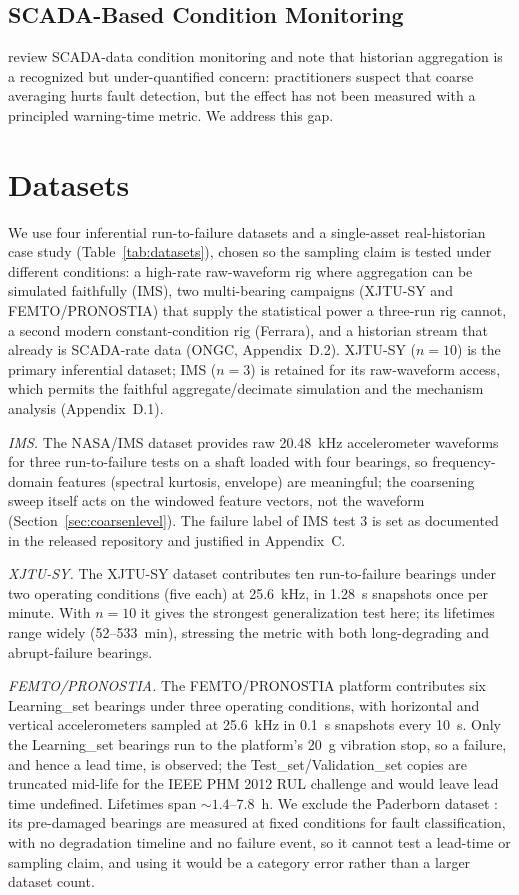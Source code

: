 \documentclass[IJPHM, 2026, 0]{PHMSociety}
\makeatletter
\def\PHMslashbreak{\kern\z@\discretionary{}{}{}}
\makeatother
\begin{document}
\subsection{SCADA-Based Condition Monitoring}
 review SCADA-data condition monitoring and note that historian aggregation is a recognized but under-quantified concern: practitioners suspect that coarse averaging hurts fault detection, but the effect has not been measured with a principled warning-time metric. We address this gap.

\section{Datasets}
\label{sec:datasets}
We use four inferential run-to-failure datasets and a single-asset real-historian case study (Table~\ref{tab:datasets}), chosen so the sampling claim is tested under different conditions: a high-rate raw-waveform rig where aggregation can be simulated faithfully (IMS), two multi-bearing campaigns (XJTU-SY and FEMTO/\PHMslashbreak PRONOSTIA) that supply the statistical power a three-run rig cannot, a second modern constant-condition rig (Ferrara), and a historian stream that already is SCADA-rate data (ONGC, Appendix~D.2). XJTU-SY ($n=10$) is the primary inferential dataset; IMS ($n=3$) is retained for its raw-waveform access, which permits the faithful aggregate/decimate simulation and the mechanism analysis (Appendix~D.1).

\emph{IMS.} The NASA/IMS dataset \cite{qiu2006wavelet} provides raw 20.48~kHz accelerometer waveforms for three run-to-failure tests on a shaft loaded with four bearings, so frequency-domain features (spectral kurtosis, envelope) are meaningful; the coarsening sweep itself acts on the windowed feature vectors, not the waveform (Section~\ref{sec:coarsenlevel}). The failure label of IMS test 3 is set as documented in the released repository and justified in Appendix~C.

\emph{XJTU-SY.} The XJTU-SY dataset \cite{wang2020hybrid} contributes ten run-to-failure bearings under two operating conditions (five each) at 25.6~kHz, in 1.28~s snapshots once per minute. With $n=10$ it gives the strongest generalization test here; its lifetimes range widely (52--533~min), stressing the metric with both long-degrading and abrupt-failure bearings.

\emph{FEMTO/\PHMslashbreak PRONOSTIA.} The FEMTO/\PHMslashbreak PRONOSTIA platform \cite{nectoux2012pronostia} contributes six Learning\_set bearings under three operating conditions, with horizontal and vertical accelerometers sampled at 25.6~kHz in 0.1~s snapshots every 10~s. Only the Learning\_set bearings run to the platform's 20~g vibration stop, so a failure, and hence a lead time, is observed; the Test\_set/Validation\_set copies are truncated mid-life for the IEEE PHM 2012 RUL challenge and would leave lead time undefined. Lifetimes span ${\sim}1.4$--7.8~h. We exclude the Paderborn dataset \cite{lessmeier2016condition}: its pre-damaged bearings are measured at fixed conditions for fault classification, with no degradation timeline and no failure event, so it cannot test a lead-time or sampling claim, and using it would be a category error rather than a larger dataset count.
\end{document}
